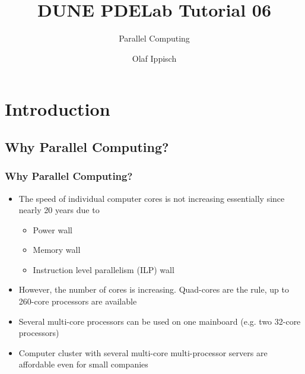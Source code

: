 \documentclass[aspectratio=169,11pt]{beamer}
\title{DUNE PDELab Tutorial 06}
\subtitle{Parallel Computing}
\author{Olaf Ippisch}
\institute[]
{
  Institut für Mathematik\\TU Clausthal
}
\theoremstyle{definition}
\begin{document}


\section{Introduction}

\subsection{Why Parallel Computing?}

\begin{frame}
\frametitle<presentation>{Why Parallel Computing?}

\begin{itemize}
\item The speed of individual computer cores is not increasing essentially since nearly 20 years due to
\begin{itemize}
\item Power wall
\item Memory wall
\item Instruction level parallelism (ILP) wall
\end{itemize}
\item However, the number of cores is increasing. Quad-cores are the rule, up to 260-core processors are available
\item Several multi-core processors can be used on one mainboard (e.g. two 32-core processors)
\item Computer cluster with several multi-core multi-processor servers are affordable even for small companies
\end{itemize}

\end{frame}
\end{document}
